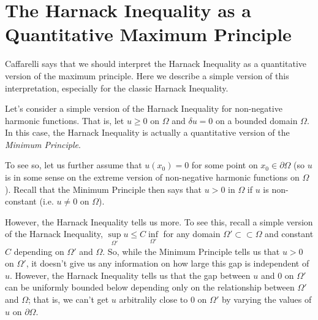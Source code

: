 \section{The Harnack Inequality as a Quantitative Maximum Principle}

Caffarelli \cite{Caffarelli1988} says that we should interpret the Harnack Inequality as a quantitative version of
the maximum principle. Here we describe a simple version of this interpretation, especially for the classic Harnack
Inequality.

Let's consider a simple version of the Harnack Inequality for non-negative harmonic functions. That is, let \(u\geq0\)
on \(\Omega\) and \(\delta u = 0\) on a bounded domain \(\Omega\). In this case, the Harnack Inequality is actually a quantitative version
of the \textit{Minimum Principle}.

To see so, let us further assume that \(u(x_0) = 0\) for some point on \(x_0 \in \partial \Omega\) (so \(u\) is in some sense on the
extreme version of non-negative harmonic functions on \(\Omega\)). Recall that the Minimum Principle then says that \(u > 0\) in   
\(\Omega\) if \(u\) is non-constant (i.e. \(u \neq 0\) on \(\Omega\)).

However, the Harnack Inequality tells us more. To see this, recall a simple version of the Harnack Inequality, 
\(\sup\limits_{\Omega'} u \leq C \inf\limits_{\Omega'} \) for any domain \(\Omega' \subset\subset \Omega\) and constant \(C\) depending
on \(\Omega'\) and \(\Omega\). So, while the Minimum Principle tells us that \(u > 0\) on \(\Omega'\), it doesn't give us any information
on how large this gap is independent of \(u\). However, the Harnack Inequality tells us that the gap between \(u\) and \(0\) on \(\Omega'\)
can be uniformly bounded below depending only on the relationship between \(\Omega'\) and \(\Omega\); that is, we can't get \(u\) arbitralily
close to \(0\) on \(\Omega'\) by varying the values of \(u\) on \(\partial \Omega\).
